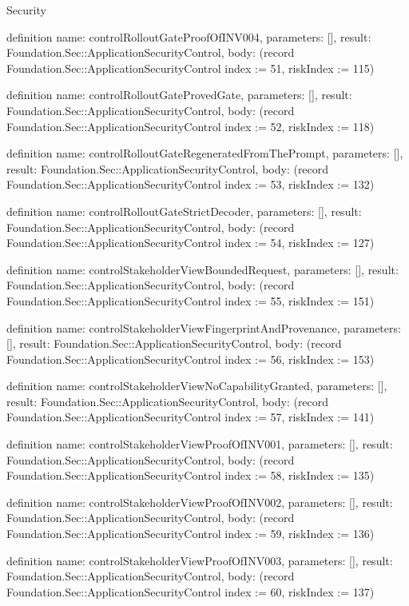 \begin{lexlean}{Security}
\begin{semanticmodule}
definition{
  name: controlRolloutGateProofOfINV004,
  parameters: [],
  result: Foundation.Sec::ApplicationSecurityControl,
  body: (record Foundation.Sec::ApplicationSecurityControl {index := 51, riskIndex := 115})
}

definition{
  name: controlRolloutGateProvedGate,
  parameters: [],
  result: Foundation.Sec::ApplicationSecurityControl,
  body: (record Foundation.Sec::ApplicationSecurityControl {index := 52, riskIndex := 118})
}

definition{
  name: controlRolloutGateRegeneratedFromThePrompt,
  parameters: [],
  result: Foundation.Sec::ApplicationSecurityControl,
  body: (record Foundation.Sec::ApplicationSecurityControl {index := 53, riskIndex := 132})
}

definition{
  name: controlRolloutGateStrictDecoder,
  parameters: [],
  result: Foundation.Sec::ApplicationSecurityControl,
  body: (record Foundation.Sec::ApplicationSecurityControl {index := 54, riskIndex := 127})
}

definition{
  name: controlStakeholderViewBoundedRequest,
  parameters: [],
  result: Foundation.Sec::ApplicationSecurityControl,
  body: (record Foundation.Sec::ApplicationSecurityControl {index := 55, riskIndex := 151})
}

definition{
  name: controlStakeholderViewFingerprintAndProvenance,
  parameters: [],
  result: Foundation.Sec::ApplicationSecurityControl,
  body: (record Foundation.Sec::ApplicationSecurityControl {index := 56, riskIndex := 153})
}

definition{
  name: controlStakeholderViewNoCapabilityGranted,
  parameters: [],
  result: Foundation.Sec::ApplicationSecurityControl,
  body: (record Foundation.Sec::ApplicationSecurityControl {index := 57, riskIndex := 141})
}

definition{
  name: controlStakeholderViewProofOfINV001,
  parameters: [],
  result: Foundation.Sec::ApplicationSecurityControl,
  body: (record Foundation.Sec::ApplicationSecurityControl {index := 58, riskIndex := 135})
}

definition{
  name: controlStakeholderViewProofOfINV002,
  parameters: [],
  result: Foundation.Sec::ApplicationSecurityControl,
  body: (record Foundation.Sec::ApplicationSecurityControl {index := 59, riskIndex := 136})
}

definition{
  name: controlStakeholderViewProofOfINV003,
  parameters: [],
  result: Foundation.Sec::ApplicationSecurityControl,
  body: (record Foundation.Sec::ApplicationSecurityControl {index := 60, riskIndex := 137})
}


\end{semanticmodule}
\end{lexlean}
